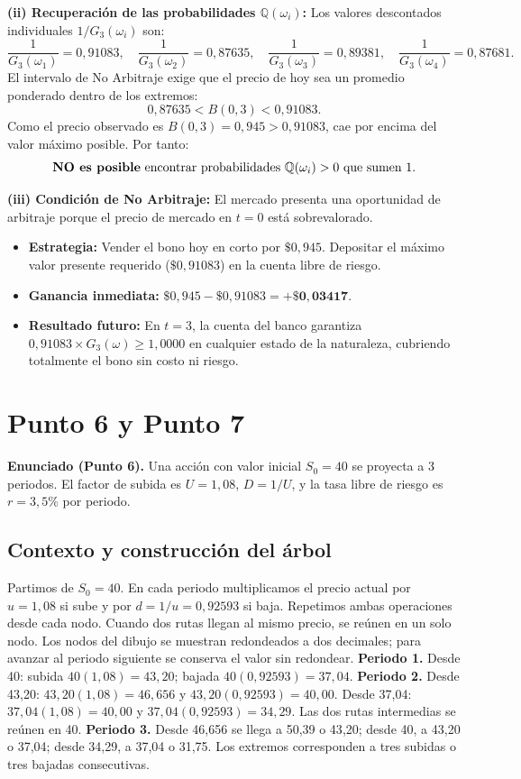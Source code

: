 \documentclass[11pt, a4paper]{article}
\begin{document}
\textbf{(ii) Recuperación de las probabilidades $\mathbb{Q}(\omega_i)$:}
Los valores descontados individuales $1/G_3(\omega_i)$ son:
\[
\frac{1}{G_3(\omega_1)} = 0{,}91083, \quad \frac{1}{G_3(\omega_2)} = 0{,}87635, \quad \frac{1}{G_3(\omega_3)} = 0{,}89381, \quad \frac{1}{G_3(\omega_4)} = 0{,}87681.
\]
El intervalo de No Arbitraje exige que el precio de hoy sea un promedio ponderado dentro de los extremos:
\[
0{,}87635 < B(0,3) < 0{,}91083.
\]
Como el precio observado es $B(0,3) = 0{,}945 > 0{,}91083$, cae por encima del valor máximo posible. Por tanto:
\[
\text{\textbf{NO es posible} encontrar probabilidades } \mathbb{Q}(\omega_i) > 0 \text{ que sumen 1.}
\]

\textbf{(iii) Condición de No Arbitraje:}
El mercado presenta una oportunidad de arbitraje porque el precio de mercado en $t=0$ está sobrevalorado.
\begin{itemize}
    \item \textbf{Estrategia:} Vender el bono hoy en corto por $\$0{,}945$. Depositar el máximo valor presente requerido ($\$0{,}91083$) en la cuenta libre de riesgo.
    \item \textbf{Ganancia inmediata:} $\$0{,}945 - \$0{,}91083 = \mathbf{+\$0{,}03417}$.
    \item \textbf{Resultado futuro:} En $t=3$, la cuenta del banco garantiza $0{,}91083 \times G_3(\omega) \ge 1{,}0000$ en cualquier estado de la naturaleza, cubriendo totalmente el bono sin costo ni riesgo.
\end{itemize}

\newpage

\section*{Punto 6 y Punto 7}
\textbf{Enunciado (Punto 6).} Una acción con valor inicial $S_0 = 40$ se proyecta a 3 periodos. El factor de subida es $U = 1{,}08$, $D = 1/U$, y la tasa libre de riesgo es $r = 3{,}5\%$ por periodo.

\subsection*{Contexto y construcción del árbol}
Partimos de \(S_0=40\). En cada periodo multiplicamos el precio actual por \(u=1{,}08\) si sube y por \(d=1/u=0{,}92593\) si baja. Repetimos ambas operaciones desde cada nodo. Cuando dos rutas llegan al mismo precio, se reúnen en un solo nodo.
Los nodos del dibujo se muestran redondeados a dos decimales; para avanzar al periodo siguiente se conserva el valor sin redondear.
\textbf{Periodo 1.} Desde 40: subida \(40(1{,}08)=43{,}20\); bajada \(40(0{,}92593)=37{,}04\).
\textbf{Periodo 2.} Desde 43{,}20: \(43{,}20(1{,}08)=46{,}656\) y \(43{,}20(0{,}92593)=40{,}00\). Desde 37{,}04: \(37{,}04(1{,}08)=40{,}00\) y \(37{,}04(0{,}92593)=34{,}29\). Las dos rutas intermedias se reúnen en 40.
\textbf{Periodo 3.} Desde 46{,}656 se llega a 50{,}39 o 43{,}20; desde 40, a 43{,}20 o 37{,}04; desde 34{,}29, a 37{,}04 o 31{,}75. Los extremos corresponden a tres subidas o tres bajadas consecutivas.
\end{document}
